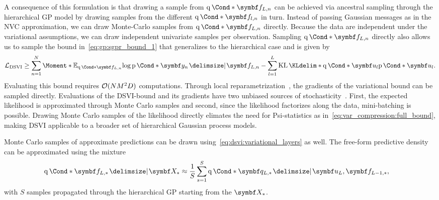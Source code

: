A consequence of this formulation is that drawing a sample from $\Variat*{\mat{f}_{L,n}}$ can be achieved via ancestral sampling through the hierarchical GP model by drawing samples from the different $\Variat*{\mat{f}_{l, n}}$ in turn.
Instead of passing Gaussian messages as in the NVC approximation, we can draw Monte-Carlo samples from $\Variat*{\mat{f}_{L, n}}$ directly.
Because the data are independent under the variational assumptions, we can draw independent univariate samples per observation.
Sampling $\Variat*{\mat{f}_{L, n}}$ directly also allows us to sample the bound in~\cref{eq:gp:sgpr_bound_1} that generalizes to the hierarchical case and is given by
\begin{equation}
    \begin{split}
        \label{eq:dsvi:full_bound}
        \Lc_{\text{DSVI}} \geq
        \sum_{n=1}^N \Moment*{\E_{\Variat*{\mat{f}_{L, n}}}}{\log \Prob*{\mat{y}_n \given \mat{f}_{L, n}}}
        - \sum_{l=1}^L \KL*{\Variat*{\mat{u}_l}}{\Prob*{\mat{u}_l}}.
    \end{split}
\end{equation}
Evaluating this bound requires $\operatorname{\mathcal{O}}(NM^2D)$ computations.
Through local reparametrization~\parencite{kingma_variational_2015}, the gradients of the variational bound can be sampled directly.
Evaluations of the DSVI-bound and its gradients have two unbiased sources of stochasticity~\parencite{salimbeni_doubly_2017}.
First, the expected likelihood is approximated through Monte Carlo samples and second, since the likelihood factorizes along the data, mini-batching is possible.
Drawing Monte Carlo samples of the likelihood directly elimates the need for Psi-statistics as in~\cref{eq:var_compression:full_bound}, making DSVI applicable to a broader set of hierarchical Gaussian process models.

Monte Carlo samples of approximate predictions can be drawn using~\cref{eq:dsvi:variational_layers} as well.
The free-form predictive density can be approximated using the mixture
\begin{equation}
    \begin{split}
        \label{eq:dsvi:approximate_predictions}
        \Variat*{\mat{f}_{L, \ast} \given \mat{X}_{\ast}}
        &\approx \frac{1}{S} \sum_{s=1}^S \Variat*{\mat{q}_{L, \ast} \given \mat{u}_L, \mat{f}_{L-1, \ast}},
    \end{split}
\end{equation}
with $S$ samples propagated through the hierarchical GP starting from the $\mat{X}_{\ast}$.
